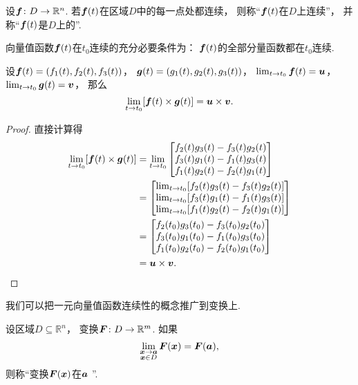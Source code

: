 \begin{definition}
设\(\boldsymbol{f}\colon D\to\mathbb{R}^n\).
若\(\boldsymbol{f}(t)\)在区域\(D\)中的每一点处都连续，
则称“\(\boldsymbol{f}(t)\)在\(D\)上连续”，
并称“\(\boldsymbol{f}(t)\)是\(D\)上的”.
\end{definition}

\begin{theorem}
向量值函数\(\boldsymbol{f}(t)\)在\(t_0\)连续的充分必要条件为：
\(\boldsymbol{f}(t)\)的全部分量函数都在\(t_0\)连续.
\end{theorem}

\begin{theorem}
设\(\boldsymbol{f}(t) = (f_1(t),f_2(t),f_3(t))\)，
\(\boldsymbol{g}(t) = (g_1(t),g_2(t),g_3(t))\)，
\(\lim_{t \to t_0} \boldsymbol{f}(t) = \boldsymbol{u}\)，
\(\lim_{t \to t_0} \boldsymbol{g}(t) = \boldsymbol{v}\)，
那么\[
	\lim_{t \to t_0} [\boldsymbol{f}(t) \times \boldsymbol{g}(t)]
	= \boldsymbol{u} \times \boldsymbol{v}.
\]
\begin{proof}
直接计算得\begin{align*}
	\lim_{t \to t_0} [\boldsymbol{f}(t) \times \boldsymbol{g}(t)]
	&= \lim_{t \to t_0} \begin{bmatrix}
		f_2(t) g_3(t) - f_3(t) g_2(t) \\
		f_3(t) g_1(t) - f_1(t) g_3(t) \\
		f_1(t) g_2(t) - f_2(t) g_1(t) \\
	\end{bmatrix} \\
	&= \begin{bmatrix}
		\lim_{t \to t_0} [f_2(t) g_3(t) - f_3(t) g_2(t)] \\
		\lim_{t \to t_0} [f_3(t) g_1(t) - f_1(t) g_3(t)] \\
		\lim_{t \to t_0} [f_1(t) g_2(t) - f_2(t) g_1(t)] \\
	\end{bmatrix} \\
	&= \begin{bmatrix}
		f_2(t_0) g_3(t_0) - f_3(t_0) g_2(t_0) \\
		f_3(t_0) g_1(t_0) - f_1(t_0) g_3(t_0) \\
		f_1(t_0) g_2(t_0) - f_2(t_0) g_1(t_0) \\
	\end{bmatrix} \\
	&= \boldsymbol{u} \times \boldsymbol{v}.
	\qedhere
\end{align*}
\end{proof}
\end{theorem}

我们可以把一元向量值函数连续性的概念推广到变换上.
\begin{definition}
设区域\(D \subseteq \mathbb{R}^n\)，
变换\(\boldsymbol{F}\colon D \to \mathbb{R}^m\).
如果\[
	\lim_{\substack{
		\boldsymbol{x}\to\boldsymbol{a} \\
		\boldsymbol{x} \in D
	}} \boldsymbol{F}(\boldsymbol{x})
	= \boldsymbol{F}(\boldsymbol{a}),
\]
则称“变换\(\boldsymbol{F}(\boldsymbol{x})\)在\(\boldsymbol{a}\) ”.
\end{definition}

